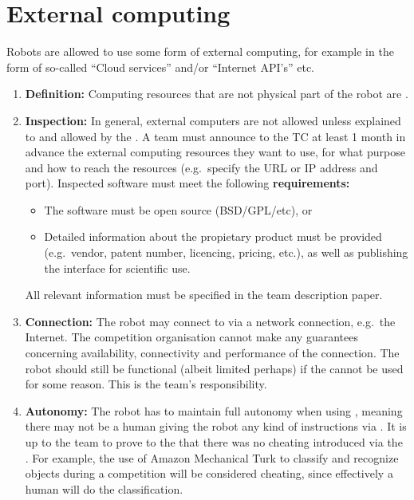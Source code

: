 \section{External computing}\label{rule:robot_external_computing}
Robots are allowed to use some form of external computing, for example in the form of so-called \enquote{Cloud services} and/or \enquote{Internet API's} etc.
\begin{enumerate}
	\item \textbf{Definition:} Computing resources that are not physical part of the robot are .
	\item \textbf{Inspection:} In general, external computers are not allowed unless explained to and allowed by the .
	  A team must announce to the TC at least 1 month in advance the external computing resources they want to use, for what purpose and how to reach the resources (e.g.~specify the URL or IP address and port). Inspected software must meet the following \textbf{requirements:}
	  \begin{itemize}
	  	\item The software must be open source (BSD/GPL/etc), or
        \item Detailed information about the propietary product must be provided (e.g.~vendor, patent number, licencing, pricing, etc.), as well as publishing the interface for scientific use.
	  \end{itemize}
	All relevant information must be specified in the team description paper.
	\item \textbf{Connection:} The robot may connect to  via a network connection, e.g.~the Internet.
	  The competition organisation cannot make any guarantees concerning availability, connectivity and performance of the connection.
	  The robot should still be functional (albeit limited perhaps) if the  cannot be used for some reason.
	  This is the team's responsibility.
	\item \textbf{Autonomy:} The robot has to maintain full autonomy when using ,
	  meaning there may not be a human giving the robot any kind of instructions via .
	  It is up to the team to prove to the  that there was no cheating introduced via the .
	  For example, the use of Amazon Mechanical Turk to classify and recognize objects during a competition will be considered cheating, since effectively a human will do the classification.

\end{enumerate}
